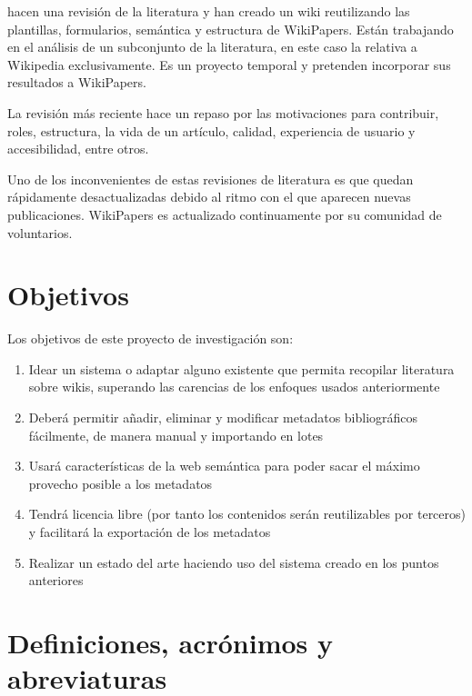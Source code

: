 \documentclass[11pt,onecolumn]{article}
\begin{document}
\cite{okoli2012} hacen una revisión de la literatura y han creado un wiki reutilizando las plantillas, formularios, semántica y estructura de WikiPapers. Están trabajando en el análisis de un subconjunto de la literatura, en este caso la relativa a Wikipedia exclusivamente. Es un proyecto temporal y pretenden incorporar sus resultados a WikiPapers.

La revisión más reciente \cite{jullien2012} hace un repaso por las motivaciones para contribuir, roles, estructura, la vida de un artículo, calidad, experiencia de usuario y accesibilidad, entre otros.

Uno de los inconvenientes de estas revisiones de literatura es que quedan rápidamente desactualizadas debido al ritmo con el que aparecen nuevas publicaciones. WikiPapers es actualizado continuamente por su comunidad de voluntarios.

\clearpage

\section{Objetivos}

Los objetivos de este proyecto de investigación son:

\begin{enumerate}
\item Idear un sistema o adaptar alguno existente que permita recopilar literatura sobre wikis, superando las carencias de los enfoques usados anteriormente
\item Deberá permitir añadir, eliminar y modificar metadatos bibliográficos fácilmente, de manera manual y importando en lotes
\item Usará características de la web semántica para poder sacar el máximo provecho posible a los metadatos
\item Tendrá licencia libre (por tanto los contenidos serán reutilizables por terceros) y facilitará la exportación de los metadatos
\item Realizar un estado del arte haciendo uso del sistema creado en los puntos anteriores
\end{enumerate}

\clearpage

\section{Definiciones, acrónimos y abreviaturas}

\end{document}
